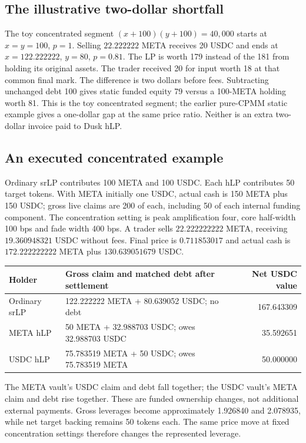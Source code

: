 \subsection{The illustrative two-dollar shortfall}

The toy concentrated segment $(x+100)(y+100)=40{,}000$ starts at $x=y=100$, $p=1$. Selling $22.222222$ META receives 20 USDC and ends at $x=122.222222$, $y=80$, $p=0.81$. The LP is worth 179 instead of the 181 from holding its original assets. The trader received 20 for input worth 18 at that common final mark. The difference is two dollars before fees. Subtracting unchanged debt 100 gives static funded equity 79 versus a 100-META holding worth 81. This is the toy concentrated segment; the earlier pure-CPMM static example gives a one-dollar gap at the same price ratio. Neither is an extra two-dollar invoice paid to Dusk hLP.

\subsection{An executed concentrated example}

Ordinary srLP contributes 100 META and 100 USDC. Each hLP contributes 50 target tokens. With META initially one USDC, actual cash is 150 META plus 150 USDC; gross live claims are 200 of each, including 50 of each internal funding component. The concentration setting is peak amplification four, core half-width 100 bps and fade width 400 bps. A trader sells $22.222222222$ META, receiving $19.360948321$ USDC without fees. Final price is $0.711853017$ and actual cash is $172.222222222$ META plus $130.639051679$ USDC.

\begin{center}\small
\begin{tabularx}{\linewidth}{@{}lXr@{}}\toprule
Holder & Gross claim and matched debt after settlement & Net USDC value \\\midrule
Ordinary srLP & 122.222222 META + 80.639052 USDC; no debt & 167.643309 \\
META hLP & 50 META + 32.988703 USDC; owes 32.988703 USDC & 35.592651 \\
USDC hLP & 75.783519 META + 50 USDC; owes 75.783519 META & 50.000000 \\\bottomrule
\end{tabularx}\end{center}

The META vault's USDC claim and debt fall together; the USDC vault's META claim and debt rise together. These are funded ownership changes, not additional external payments. Gross leverages become approximately 1.926840 and 2.078935, while net target backing remains 50 tokens each. The same price move at fixed concentration settings therefore changes the represented leverage.

